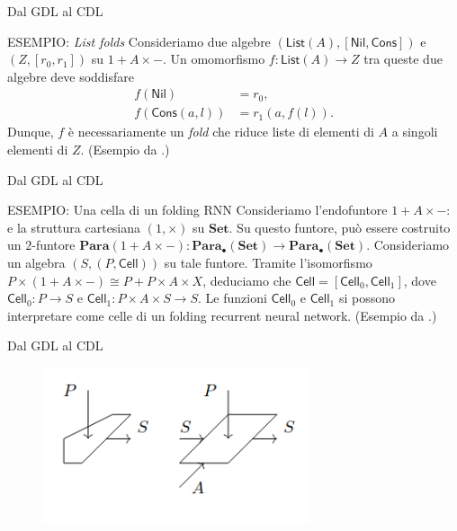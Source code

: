 \documentclass{beamer}
\begin{document}
\begin{frame}{Dal GDL al CDL}
    \begin{block}{ESEMPIO: \textit{List folds}}
        Consideriamo due algebre $(\mathsf{List}(A), [\mathsf{Nil}, \mathsf{Cons}])$ e $(Z, [r_0,r_1])$ su $1 + A \times -$. Un omomorfismo $f: \mathsf{List}(A) \to Z$ tra queste due algebre deve soddisfare 
        \begin{align*}
            f(\mathsf{Nil}) &= r_0,\\
            f(\mathsf{Cons}(a,l)) &= r_1(a,f(l)). 
        \end{align*}
        Dunque, $f$ è necessariamente un \textit{fold} che riduce liste di elementi di $A$ a singoli elementi di $Z$. (Esempio da \cite{gavranovicposition}.)
    \end{block}
\end{frame}

\begin{frame}{Dal GDL al CDL}
    \begin{block}{ESEMPIO: Una cella di un folding RNN}
        Consideriamo l'endofuntore $1 + A \times -:$ e la struttura cartesiana $(1, \times)$ su $\mathbf{Set}$. Su questo funtore, può essere costruito un $2$-funtore $\mathbf{Para}(1 + A \times -): \mathbf{Para}_{\bullet}(\mathbf{Set}) \to \mathbf{Para}_{\bullet}(\mathbf{Set})$. Consideriamo un algebra $(S,(P,\mathsf{Cell}))$ su tale funtore. Tramite l'isomorfismo $P \times (1 + A \times -) \cong P + P \times A \times X$, deduciamo che $\mathsf{Cell} = [\mathsf{Cell}_0, \mathsf{Cell}_1]$, dove $\mathsf{Cell}_0: P \to S$ e  $\mathsf{Cell}_1: P \times A \times S \to S$. Le funzioni $\mathsf{Cell}_0$ e $\mathsf{Cell}_1$ si possono interpretare come celle di un folding recurrent neural network. (Esempio da \cite{gavranovicposition}.)
    \end{block}
\end{frame}

\begin{frame}{Dal GDL al CDL}
    \begin{figure}
        \begin{center}
            \includegraphics[width=0.7\textwidth]{figures/folding_rnn_cell.png}
            \caption*{\cite{gavranovicposition}}
        \end{center}
    \end{figure}
\end{frame}
\end{document}
